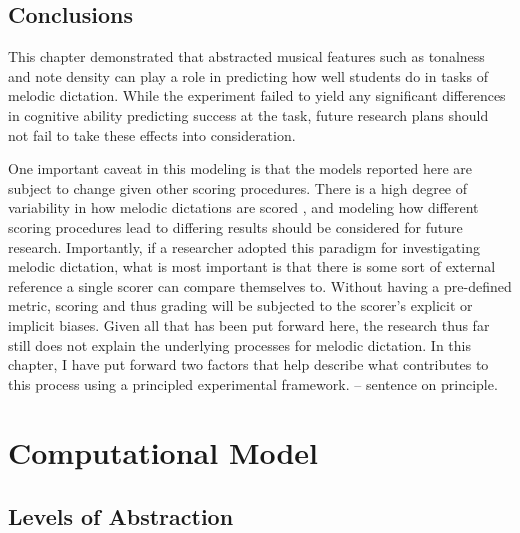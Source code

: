 \documentclass[12pt,]{book}
\begin{document}
\hypertarget{conclusions-2}{%
\section{Conclusions}\label{conclusions-2}}

This chapter demonstrated that abstracted musical features such as tonalness and note density can play a role in predicting how well students do in tasks of melodic dictation.
While the experiment failed to yield any significant differences in cognitive ability predicting success at the task, future research plans should not fail to take these effects into consideration.

One important caveat in this modeling is that the models reported here are subject to change given other scoring procedures.
There is a high degree of variability in how melodic dictations are scored \citep{gillespieMelodicDictationScoring2001}, and modeling how different scoring procedures lead to differing results should be considered for future research.
Importantly, if a researcher adopted this paradigm for investigating melodic dictation, what is most important is that there is some sort of external reference a single scorer can compare themselves to.
Without having a pre-defined metric, scoring and thus grading will be subjected to the scorer's explicit or implicit biases.
Given all that has been put forward here, the research thus far still does not explain the underlying processes for melodic dictation.
In this chapter, I have put forward two factors that help describe what contributes to this process using a principled experimental framework.
-- sentence on principle.

\hypertarget{computational-model}{%
\chapter{Computational Model}\label{computational-model}}

\hypertarget{levels-of-abstraction}{%
\section{Levels of Abstraction}\label{levels-of-abstraction}}
\end{document}
